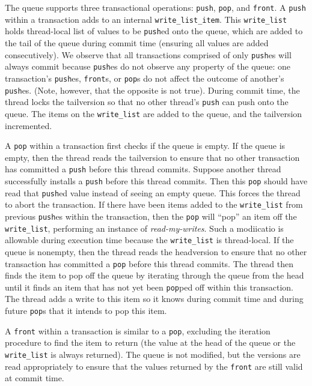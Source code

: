 The queue supports three transactional operations: \texttt{push}, \texttt{pop}, and \texttt{front}. A \texttt{push} within a transaction adds to an internal \texttt{write\_list\_item}. This \texttt{write\_list} holds thread-local list of values to be \texttt{push}ed onto the queue, which are added to the tail of the queue during commit time (ensuring all values are added consecutively). We observe that all transactions comprised of only \texttt{push}es will always commit because \texttt{push}es do not observe any property of the queue: one transaction's \texttt{push}es, \texttt{front}s, or \texttt{pop}s do not affect the outcome of another's \texttt{push}es. (Note, however, that the opposite is not true). During commit time, the thread locks the tailversion so that no other thread's \texttt{push} can push onto the queue. The items on the \texttt{write\_list} are added to the queue, and the tailversion incremented.

A \texttt{pop} within a transaction first checks if the queue is empty. If the queue is empty, then the thread reads the tailversion to ensure that no other transaction has committed a \texttt{push} before this thread commits. Suppose another thread successfully installs a \texttt{push} before this thread commits. Then this \texttt{pop} should have read that \texttt{push}ed value instead of seeing an empty queue. This forces the thread to abort the transaction. If there have been items added to the \texttt{write\_list} from previous \texttt{push}es within the transaction, then the \texttt{pop} will “pop” an item off the \texttt{write\_list}, performing an instance of \emph{read-my-writes}. Such a modiicatio is allowable during execution time because the \texttt{write\_list} is thread-local. If the queue is nonempty, then the thread reads the headversion to ensure that no other transaction has committed a \texttt{pop} before this thread commits. The thread then finds the item to pop off the queue by iterating through the queue from the head until it finds an item that has not yet been \texttt{pop}ped off within this transaction. The thread adds a write to this item so it knows during commit time and during future \texttt{pop}s that it intends to pop this item.

A \texttt{front} within a transaction is similar to a \texttt{pop}, excluding the iteration procedure to find the item to return (the value at the head of the queue or the \texttt{write\_list} is always returned). The queue is not modified, but the versions are read appropriately to ensure that the values returned by the \texttt{front} are still valid at commit time.

